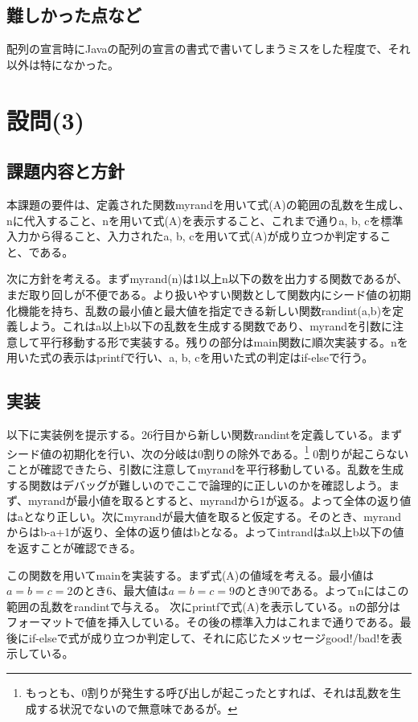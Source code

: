 \documentclass[dvipdfmx,12pt,a4j]{jarticle}
\begin{document}
\subsection{難しかった点など}
配列の宣言時にJavaの配列の宣言の書式で書いてしまうミスをした程度で、それ以外は特になかった。

\section{設問(3)}
\subsection{課題内容と方針}
本課題の要件は、定義された関数myrandを用いて式(A)の範囲の乱数を生成し、nに代入すること、nを用いて式(A)を表示すること、これまで通りa, b, cを標準入力から得ること、入力されたa, b, cを用いて式(A)が成り立つか判定すること、である。

次に方針を考える。まずmyrand(n)は1以上n以下の数を出力する関数であるが、まだ取り回しが不便である。より扱いやすい関数として関数内にシード値の初期化機能を持ち、乱数の最小値と最大値を指定できる新しい関数randint(a,b)を定義しよう。これはa以上b以下の乱数を生成する関数であり、myrandを引数に注意して平行移動する形で実装する。残りの部分はmain関数に順次実装する。nを用いた式の表示はprintfで行い、a, b, cを用いた式の判定はif-elseで行う。

\subsection{実装}
以下に実装例を提示する。26行目から新しい関数randintを定義している。まずシード値の初期化を行い、次の分岐は0割りの除外である。\footnote{もっとも、0割りが発生する呼び出しが起こったとすれば、それは乱数を生成する状況でないので無意味であるが。}
0割りが起こらないことが確認できたら、引数に注意してmyrandを平行移動している。乱数を生成する関数はデバッグが難しいのでここで論理的に正しいのかを確認しよう。まず、myrandが最小値を取るとすると、myrandから1が返る。よって全体の返り値はaとなり正しい。次にmyrandが最大値を取ると仮定する。そのとき、myrandからはb-a+1が返り、全体の返り値はbとなる。よってintrandはa以上b以下の値を返すことが確認できる。

この関数を用いてmainを実装する。まず式(A)の値域を考える。最小値は$a=b=c=2$のとき6、最大値は$a=b=c=9$のとき90である。よってnにはこの範囲の乱数をrandintで与える。
次にprintfで式(A)を表示している。nの部分はフォーマットで値を挿入している。その後の標準入力はこれまで通りである。最後にif-elseで式が成り立つか判定して、それに応じたメッセージgood!/bad!を表示している。

\end{document}
